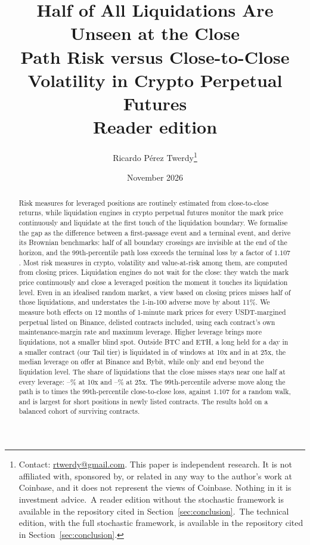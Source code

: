 \title{\textbf{Half of All Liquidations Are Unseen at the Close}\\[0.3em]
\large Path Risk versus Close-to-Close Volatility in Crypto Perpetual Futures\iftechnical\else\\[0.2em]
\normalsize Reader edition\fi}
\author{Ricardo P\'erez Twerdy\thanks{Contact: \href{mailto:rtwerdy@gmail.com}{rtwerdy@gmail.com}.
This paper is independent research. It is not affiliated with, sponsored by, or related in any way
to the author's work at Coinbase, and it does not represent the views of Coinbase. Nothing in it is
investment advice.\iftechnical\ A reader edition without the stochastic framework is available in
the repository cited in Section~\ref{sec:conclusion}.\else\ The technical edition, with the full
stochastic framework, is available in the repository cited in Section~\ref{sec:conclusion}.\fi}}
\date{November 2026}


\maketitle

\begin{abstract}
\noindent
\iftechnical
Risk measures for leveraged positions are routinely estimated from close-to-close returns, while
liquidation engines in crypto perpetual futures monitor the mark price continuously and liquidate at
the first touch of the liquidation boundary. We formalise the gap as the difference between a
first-passage event and a terminal event, and derive its Brownian benchmarks: half of all boundary
crossings are invisible at the end of the horizon, and the 99th-percentile path loss exceeds the
terminal loss by a factor of $1.107$.
\else
Most risk measures in crypto, volatility and value-at-risk among them, are computed from closing
prices. Liquidation engines do not wait for the
close: they watch the mark price continuously and close a leveraged position the moment it touches
its liquidation level. Even in an idealised random market, a view based on closing prices misses
half of those liquidations, and understates the 1-in-100 adverse move by about 11\%.
\fi
We measure both effects on 12 months of 1-minute mark prices for every USDT-margined perpetual
listed on Binance, delisted contracts included, using each contract's own maintenance-margin rate
and maximum leverage. Higher leverage brings more liquidations, not a smaller blind spot. Outside
BTC and ETH, a long held for a day in a smaller contract (our Tail tier) is liquidated in \TailDayLongPP{} of windows at 10x
and in \TailDayLongPPTwentyFive{} at 25x, the median leverage on offer at Binance and Bybit, while
only \TailDayLongPC{} and \TailDayLongPCTwentyFive{} end beyond the liquidation level. The share of
liquidations that the close misses stays near one half at every leverage: \UTenLo--\UTenHi\% at
10x and \UTwentyFiveLo--\UTwentyFiveHi\% at 25x. The 99th-percentile adverse move along the path is
\KappaLo{} to \KappaHi{} times the 99th-percentile close-to-close loss, against $1.107$ for a random
walk, and is largest for short positions in newly listed contracts. The results hold on a balanced
cohort of surviving contracts.
\end{abstract}

